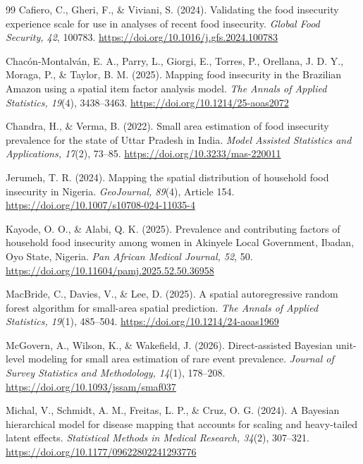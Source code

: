\documentclass[12pt,a4paper]{article}
\theoremstyle{definition}
\theoremstyle{remark}
\begin{document}
\begin{sloppypar}
\raggedright
\begin{thebibliography}{99}
Cafiero, C., Gheri, F., \& Viviani, S. (2024). Validating the food insecurity experience scale for
use in analyses of recent food insecurity. \emph{Global Food Security, 42}, 100783.
\url{https://doi.org/10.1016/j.gfs.2024.100783}

Chacón-Montalván, E. A., Parry, L., Giorgi, E., Torres, P., Orellana, J. D. Y., Moraga, P., \&
Taylor, B. M. (2025). Mapping food insecurity in the Brazilian Amazon using a spatial item factor
analysis model. \emph{The Annals of Applied Statistics, 19}(4), 3438--3463.
\url{https://doi.org/10.1214/25-aoas2072}

Chandra, H., \& Verma, B. (2022). Small area estimation of food insecurity prevalence for the state
of Uttar Pradesh in India. \emph{Model Assisted Statistics and Applications, 17}(2), 73--85.
\url{https://doi.org/10.3233/mas-220011}

Jerumeh, T. R. (2024). Mapping the spatial distribution of household food insecurity in Nigeria.
\emph{GeoJournal, 89}(4), Article 154. \url{https://doi.org/10.1007/s10708-024-11035-4}

Kayode, O. O., \& Alabi, Q. K. (2025). Prevalence and contributing factors of household food
insecurity among women in Akinyele Local Government, Ibadan, Oyo State, Nigeria. \emph{Pan African
Medical Journal, 52}, 50. \url{https://doi.org/10.11604/pamj.2025.52.50.36958}

MacBride, C., Davies, V., \& Lee, D. (2025). A spatial autoregressive random forest algorithm for
small-area spatial prediction. \emph{The Annals of Applied Statistics, 19}(1), 485--504.
\url{https://doi.org/10.1214/24-aoas1969}

McGovern, A., Wilson, K., \& Wakefield, J. (2026). Direct-assisted Bayesian unit-level modeling for
small area estimation of rare event prevalence. \emph{Journal of Survey Statistics and Methodology,
14}(1), 178--208. \url{https://doi.org/10.1093/jssam/smaf037}

Michal, V., Schmidt, A. M., Freitas, L. P., \& Cruz, O. G. (2024). A Bayesian hierarchical model for
disease mapping that accounts for scaling and heavy-tailed latent effects. \emph{Statistical Methods
in Medical Research, 34}(2), 307--321. \url{https://doi.org/10.1177/09622802241293776}


\end{thebibliography}
\end{sloppypar}
\end{document}
